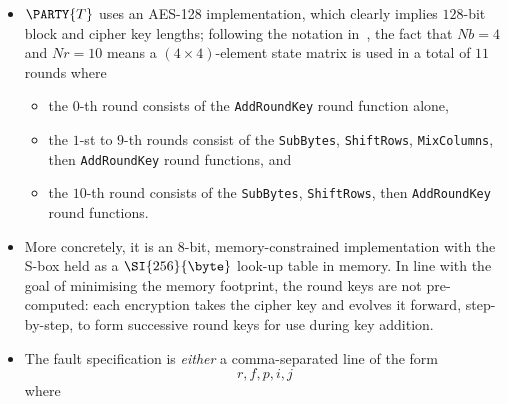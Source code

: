 \begin{itemize}
\item $\PARTY{T}$ uses an AES-128 implementation,
      which clearly implies $128$-bit block and cipher key lengths;
      following the notation in~\cite[Figure 5]{SCALE:FIPS:197:01}, the 
      fact that 
      $
      Nb =  4
      $ 
      and 
      $
      Nr = 10
      $ 
      means a $( 4 \times 4 )$-element state matrix is used in a total of 
      $11$ rounds
      where

      \begin{itemize}
      \item the  $0$-th           round  consists of the
            \lstinline{AddRoundKey}
            round function  alone,
      \item the  $1$-st to $9$-th rounds consist  of the
            \lstinline{SubBytes}, \lstinline{ShiftRows},  \lstinline{MixColumns}, then  \lstinline{AddRoundKey}
            round functions,
            and
      \item the $10$-th           round  consists of the
            \lstinline{SubBytes}, \lstinline{ShiftRows},                          then  \lstinline{AddRoundKey}
            round functions.
      \end{itemize}

\item More concretely, it is an $8$-bit, memory-constrained implementation
      with the S-box held as a $\SI{256}{\byte}$ look-up table in memory. 
      In line with the goal of minimising the memory footprint, the round
      keys are not pre-computed: each encryption takes the cipher key and
      evolves it forward, step-by-step, to form successive round keys for
      use during key addition.  
\item The fault specification is {\em either} a comma-separated line of the
      form
      \[
      r, f, p, i, j
      \]
      where


\end{itemize}
